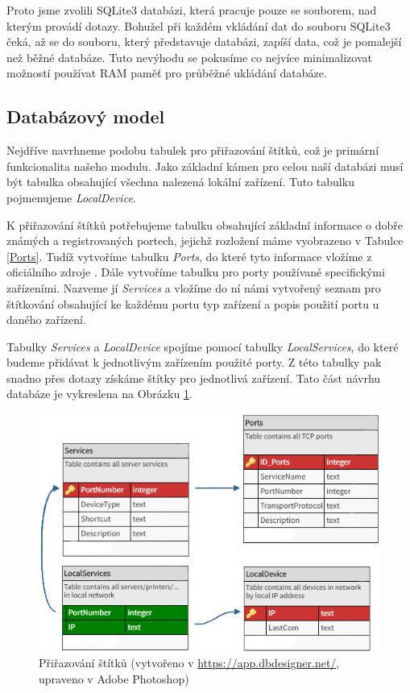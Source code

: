 \documentclass[thesis=B,czech,hidelinks]{FITthesis}[2019/03/21]
\begin{document}
        Proto jsme zvolili SQLite3 databázi, která pracuje pouze se souborem, nad kterým provádí dotazy. Bohužel při každém vkládání dat do souboru SQLite3 čeká, až se do souboru, který představuje databázi, zapíší data, což je pomalejší než běžné databáze. Tuto nevýhodu se pokusíme co nejvíce minimalizovat možností používat RAM paměť pro průběžné ukládání databáze.
        
        \subsection{Databázový model}
        Nejdříve navrhneme podobu tabulek pro přiřazování štítků, což je primární funkcionalita našeho modulu. Jako základní kámen pro celou naší databázi musí být tabulka obsahující všechna nalezená lokální zařízení. Tuto tabulku pojmenujeme \emph{LocalDevice}. 
        
        K přiřazování štítků potřebujeme tabulku obsahující základní informace o dobře známých a registrovaných portech, jejichž rozložení máme vyobrazeno v Tabulce \ref{Ports}. Tudíž vytvoříme tabulku \emph{Ports}, do které tyto informace vložíme z oficiálního zdroje \cite{IANA}. 
        Dále vytvoříme tabulku pro porty používané specifickými zařízeními. Nazveme jí \emph{Services} a vložíme do ní námi vytvořený seznam pro štítkování obsahující ke každému portu typ zařízení a popis použití portu u daného zařízení. 
        
        Tabulky \emph{Services} a \emph{LocalDevice} spojíme pomocí tabulky \emph{LocalServices}, do které budeme přidávat k jednotlivým zařízením použité porty. Z této tabulky pak snadno přes dotazy získáme štítky pro jednotlivá zařízení. Tato část návrhu databáze je vykreslena na Obrázku \ref{DBLabels}.
        \begin{figure}[h]
            \centering
            \includegraphics[width=\textwidth]{databaze_services.png}
            \caption[Přiřazování štítků]{Přiřazování štítků (vytvořeno v \url{https://app.dbdesigner.net/}, upraveno v Adobe Photoshop) }
            \label{DBLabels}
        \end{figure}
        
\end{document}
